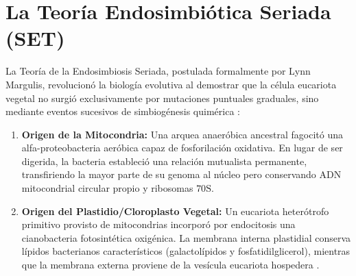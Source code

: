 \documentclass[12pt,spanish,letterpaper,oneside]{article}
\begin{document}
\section{La Teoría Endosimbiótica Seriada (SET)}
La Teoría de la Endosimbiosis Seriada, postulada formalmente por Lynn Margulis, revolucionó la biología evolutiva al demostrar que la célula eucariota vegetal no surgió exclusivamente por mutaciones puntuales graduales, sino mediante eventos sucesivos de simbiogénesis quimérica \parencite{alberts2015}:
\begin{enumerate}
    \item \textbf{Origen de la Mitocondria:} Una arquea anaeróbica ancestral fagocitó una alfa-proteobacteria aeróbica capaz de fosforilación oxidativa. En lugar de ser digerida, la bacteria estableció una relación mutualista permanente, transfiriendo la mayor parte de su genoma al núcleo pero conservando ADN mitocondrial circular propio y ribosomas $70\text{S}$.
    \item \textbf{Origen del Plastidio/Cloroplasto Vegetal:} Un eucariota heterótrofo primitivo provisto de mitocondrias incorporó por endocitosis una cianobacteria fotosintética oxigénica. La membrana interna plastidial conserva lípidos bacterianos característicos (galactolípidos y fosfatidilglicerol), mientras que la membrana externa proviene de la vesícula eucariota hospedera \parencite{taiz2015}.
\end{enumerate}
\end{document}
